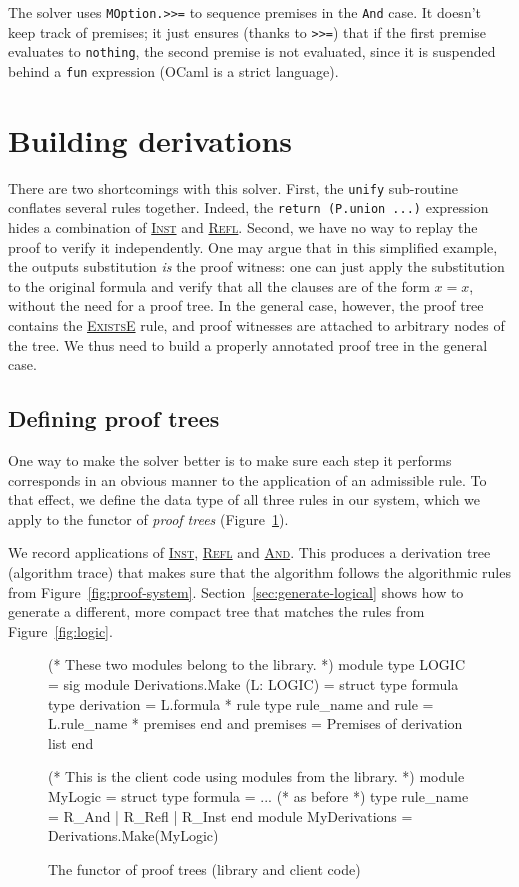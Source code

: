 \documentclass{easychair}
\def\li{\lstinline}
\let\TirName\textsc
\renewcommand{\DefTirName}[1]{\hyperlink{#1}{\TirName {#1}}}
\let\Rule\DefTirName
\newcommand{\fref}[1]{Figure~\ref{fig:#1}}
\newcommand{\sref}[1]{Section~\ref{sec:#1}}
\begin{document}
The solver uses \li+MOption.>>=+ to sequence premises in the \li+And+ case. It
doesn't keep track of premises; it just ensures (thanks to \li+>>=+) that if the
first premise evaluates to \li+nothing+, the second premise is not evaluated,
since it is suspended behind a \li+fun+ expression (OCaml is a strict language).

\section{Building derivations}
\label{sec:derivations}

There are two shortcomings with this solver. First, the \li+unify+ sub-routine
conflates several rules together. Indeed, the \li+return (P.union ...)+
expression hides a combination of \Rule{Inst} and \Rule{Refl}. Second, we
have no way to replay the proof to verify it independently. One may argue that
in this simplified example, the outputs substitution \emph{is} the proof
witness: one can just apply the substitution to the original
formula and verify that all the clauses are of the form $x = x$, without the
need for a proof tree. In the general case, however, the proof tree contains the
\Rule{ExistsE} rule, and proof witnesses are attached to arbitrary nodes of the
tree. We thus need to build a properly annotated proof tree in the general case.

\subsection{Defining proof trees}

One way to make the solver better is to make sure each step it performs
corresponds in an obvious manner to the application of an admissible rule. To
that effect, we define the data type of all three rules in our system, which we
apply to the functor of \emph{proof trees} (\fref{proof-trees}).

We record applications of \Rule{Inst}, \Rule{Refl} and \Rule{And}. This produces
a derivation tree (algorithm trace) that makes sure that the algorithm follows
the algorithmic rules from \fref{proof-system}. \sref{generate-logical} shows
how to generate a different, more compact tree that matches the rules from
\fref{logic}.

\begin{figure}
  \centering
\begin{ocaml}
(* These two modules belong to the library. *)
module type LOGIC = sig     module Derivations.Make (L: LOGIC) = struct
  type formula                type derivation = L.formula * rule
  type rule_name              and rule = L.rule_name * premises
end                           and premises = Premises of derivation list
                            end

(* This is the client code using modules from the library. *)
module MyLogic = struct
  type formula = ... (* as before *)
  type rule_name = R_And | R_Refl | R_Inst
end
module MyDerivations = Derivations.Make(MyLogic)
\end{ocaml}
  \caption{The functor of proof trees (library and client code)}
  \label{fig:proof-trees}
\end{figure}
\end{document}
